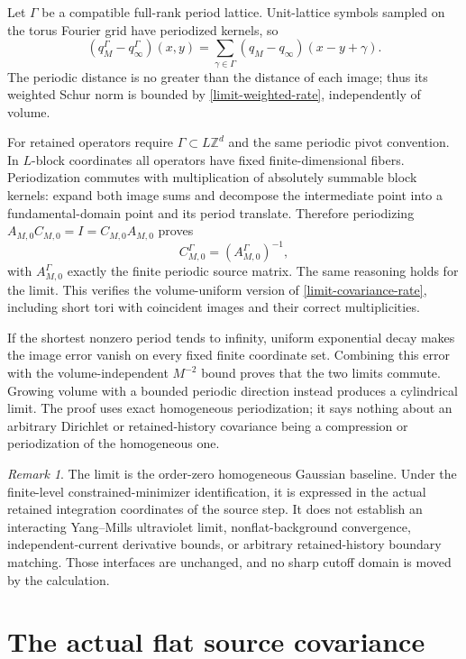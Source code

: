 \documentclass[11pt]{article}
\theoremstyle{remark}
\newtheorem{remark}[theorem]{Remark}
\begin{document}
Let $\Gamma$ be a compatible full-rank period lattice. Unit-lattice
symbols sampled on the torus Fourier grid have periodized kernels, so
\begin{equation}\label{limit-periodization}
 (q_M^\Gamma-q_\infty^\Gamma)(x,y)
 =\sum_{\gamma\in\Gamma}(q_M-q_\infty)(x-y+\gamma).
\end{equation}
The periodic distance is no greater than the distance of each image;
thus its weighted Schur norm is bounded by
\eqref{limit-weighted-rate}, independently of volume.

For retained operators require $\Gamma\subset L\mathbb Z^d$ and
the same periodic pivot convention. In $L$-block coordinates all
operators have fixed finite-dimensional fibers. Periodization
commutes with multiplication of absolutely summable block kernels:
expand both image sums and decompose the intermediate point into a
fundamental-domain point and its period translate. Therefore
periodizing $A_{M,0}C_{M,0}=I=C_{M,0}A_{M,0}$ proves
\[
 C_{M,0}^\Gamma=(A_{M,0}^\Gamma)^{-1},
\]
with $A_{M,0}^\Gamma$ exactly the finite periodic source matrix.
The same reasoning holds for the limit. This verifies the
volume-uniform version of \eqref{limit-covariance-rate}, including
short tori with coincident images and their correct multiplicities.

If the shortest nonzero period tends to infinity, uniform exponential
decay makes the image error vanish on every fixed finite coordinate
set. Combining this error with the volume-independent $M^{-2}$ bound
proves that the two limits commute. Growing volume with a bounded
periodic direction instead produces a cylindrical limit. The proof
uses exact homogeneous periodization; it says nothing about an
arbitrary Dirichlet or retained-history covariance being a compression
or periodization of the homogeneous one.

\begin{remark}\label{limit-scope}
The limit is the order-zero homogeneous Gaussian baseline. Under the
finite-level constrained-minimizer identification, it is expressed in
the actual retained integration coordinates of the source step. It
does not establish an interacting Yang--Mills ultraviolet limit,
nonflat-background convergence, independent-current derivative
bounds, or arbitrary retained-history boundary matching. Those
interfaces are unchanged, and no sharp cutoff domain is moved by
the calculation.
\end{remark}

\section{The actual flat source covariance}\label{sec:source}
\end{document}
